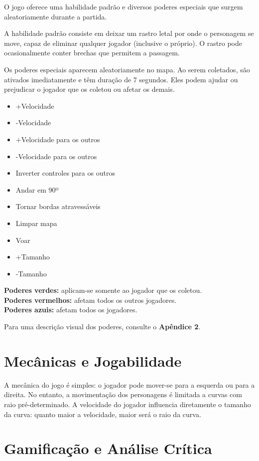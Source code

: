 O jogo oferece uma habilidade padrão e diversos poderes especiais que surgem aleatoriamente durante a partida.

A habilidade padrão consiste em deixar um rastro letal por onde o personagem se move, capaz de eliminar qualquer jogador (inclusive o próprio). O rastro pode ocasionalmente conter brechas que permitem a passagem.

Os poderes especiais aparecem aleatoriamente no mapa. Ao serem coletados, são ativados imediatamente e têm duração de 7 segundos. Eles podem ajudar ou prejudicar o jogador que os coletou ou afetar os demais.

\begin{itemize}
    \item +Velocidade
    \item -Velocidade
    \item +Velocidade para os outros
    \item -Velocidade para os outros
    \item Inverter controles para os outros
    \item Andar em 90º
    \item Tornar bordas atravessáveis
    \item Limpar mapa
    \item Voar
    \item +Tamanho
    \item -Tamanho
\end{itemize}
\textbf{Poderes verdes:} aplicam-se somente ao jogador que os coletou.\\
\textbf{Poderes vermelhos:} afetam todos os outros jogadores.\\
\textbf{Poderes azuis:} afetam todos os jogadores.

Para uma descrição visual dos poderes, consulte o \textbf{Apêndice 2}.

\section{Mecânicas e Jogabilidade}

A mecânica do jogo é simples: o jogador pode mover-se para a esquerda ou para a direita. No entanto, a movimentação dos personagens é limitada a curvas com raio pré-determinado. A velocidade do jogador influencia diretamente o tamanho da curva: quanto maior a velocidade, maior será o raio da curva.

\section{Gamificação e Análise Crítica}

